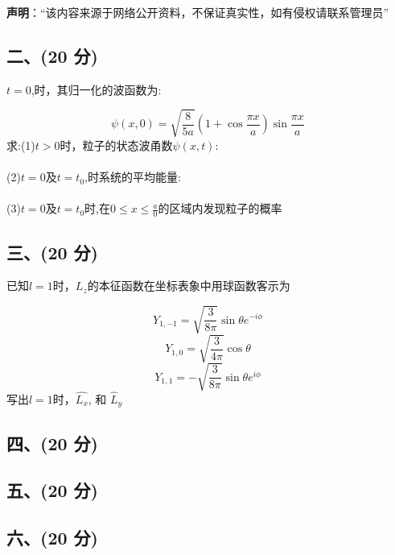 
\textbf{声明}：“该内容来源于网络公开资料，不保证真实性，如有侵权请联系管理员”

\subsection{二、(20 分)}
 \( t = 0 \),时，其归一化的波函数为:

\[
\psi(x,0) = \sqrt{\frac{8}{5a}} (1 + \cos\frac{\pi x}{a}) \sin\frac{\pi x}{a}~
\]
求:(1)$t>0$时，粒子的状态波甬数$\psi(x,t)$:\\\\
(2)$t=0$及$t=t_0$,时系统的平均能量:\\\\
(3)$t=0$及$t=t_0$时,在$0\leq x\leq \frac{a}{0}$的区域内发现粒子的概率
\subsection{三、(20 分)}
已知$l=1$时，$L_z$的本征函数在坐标表象中用球函数客示为

\[Y_{1,-1} = \sqrt{\frac{3}{8\pi}} \sin \theta e^{-i\phi}~
\]
\[
Y_{1,0} = \sqrt{\frac{3}{4\pi}} \cos \theta~
\]
\[
Y_{1,1} = -\sqrt{\frac{3}{8\pi}} \sin \theta e^{i\phi}~
\]
写出$l=1$时，$\hat{L_x}$, 和 $\hat{L}_y $
\subsection{四、(20 分)}

\subsection{五、(20 分)}

\subsection{六、(20 分)}





